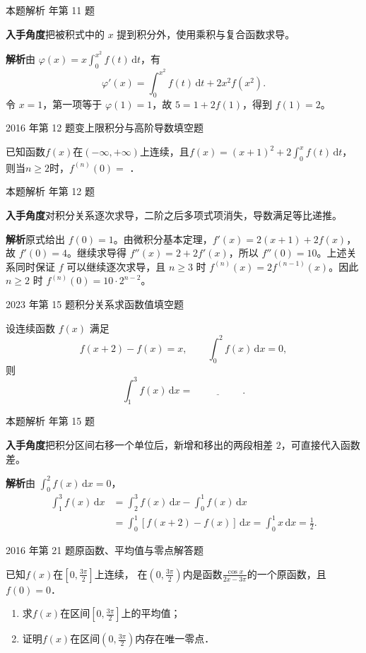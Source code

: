 \documentclass[UTF8,zihao=-4,fontset=fandol]{ctexart}
\newcommand{\blank}{\underline{\hspace{5em}}}
\newcommand{\QuestionPage}[6]{%
  \par\noindent\begin{minipage}{\linewidth}
  \raggedright
  {\small\textcolor{black!60}{#3\quad #5}\hfill\textcolor{accent}{#2}}\par\smallskip}
\newcommand{\QuestionEnd}{\end{minipage}\par\medskip}
\newcommand{\QuestionPage}[6]{%
  \clearpage
  {\small\textcolor{accent}{#1\hfill #2}}\par\medskip
  {\small\textcolor{black!60}{#3\quad #5\hfill #6}}\par\vspace{9bp}}
\newcommand{\QuestionEnd}{}
\newenvironment{QuestionSolution}[1]{%
  \clearpage
  {\small\textcolor{black!60}{本题解析\quad #1}}\par\medskip
}{\par\clearpage}
\begin{document}
\begin{QuestionSolution}{2015 年第 11 题}
\textbf{入手角度}\quad 把被积式中的 \(x\) 提到积分外，使用乘积与复合函数求导。

\textbf{解析}\quad 由 \(\varphi(x)=x\int_0^{x^2} f(t)\,\mathrm{d}t\)，有
\[
\varphi'(x)=\int_0^{x^2}f(t)\,\mathrm{d}t+2x^2 f(x^2).
\]
令 \(x=1\)，第一项等于 \(\varphi(1)=1\)，故 \(5=1+2f(1)\)，得到 \(f(1)=\boxed{2}\)。
\end{QuestionSolution}

\QuestionPage{3.2 微积分基本公式与基本定理}{填空题}{2016 年第 12 题}{2}{变上限积分与高阶导数}{146 / 234}
已知函数$f(x)$在$(-\infty,+\infty)$上连续，且$f(x) = (x + 1)^2 + 2\int_0^x f(t) \,\mathrm{d} t$，
则当$n \ge 2$时，$f^{(n)}(0) =$ \blank{}．
\QuestionEnd

\begin{QuestionSolution}{2016 年第 12 题}
\textbf{入手角度}\quad 对积分关系逐次求导，二阶之后多项式项消失，导数满足等比递推。

\textbf{解析}\quad 原式给出 \(f(0)=1\)。由微积分基本定理，\(f'(x)=2(x+1)+2f(x)\)，故 \(f'(0)=4\)。继续求导得 \(f''(x)=2+2f'(x)\)，所以 \(f''(0)=10\)。上述关系同时保证 \(f\) 可以继续逐次求导，且 \(n\ge3\) 时 \(f^{(n)}(x)=2f^{(n-1)}(x)\)。因此 \(n\ge2\) 时 \(f^{(n)}(0)=\boxed{10\cdot2^{n-2}}\)。
\end{QuestionSolution}

\QuestionPage{3.2 微积分基本公式与基本定理}{填空题}{2023 年第 15 题}{2}{积分关系求函数值}{147 / 234}
设连续函数 \(f(x)\) 满足
\[f(x+2)-f(x)=x,\qquad \int_0^2 f(x)\,\mathrm{d}x=0,
\]
则
\[\int_1^3 f(x)\,\mathrm{d}x=\blank{}.
\]
\QuestionEnd

\begin{QuestionSolution}{2023 年第 15 题}
\textbf{入手角度}\quad 把积分区间右移一个单位后，新增和移出的两段相差 \(2\)，可直接代入函数差。

\textbf{解析}\quad 由 \(\int_0^2 f(x)\,\mathrm{d}x=0\)，
\[
\begin{aligned}
\int_1^3f(x)\,\mathrm{d}x
&=\int_2^3f(x)\,\mathrm{d}x-\int_0^1f(x)\,\mathrm{d}x\\
&=\int_0^1[f(x+2)-f(x)]\,\mathrm{d}x
=\int_0^1 x\,\mathrm{d}x=\boxed{\frac12}.
\end{aligned}
\]
\end{QuestionSolution}

\QuestionPage{3.2 微积分基本公式与基本定理}{解答题}{2016 年第 21 题}{4}{原函数、平均值与零点}{148 / 234}
已知$f(x)$在$\left[0,\frac{3\pi}{2} \right]$上连续，
在$\left(0,\frac{3\pi}{2} \right)$内是函数$\frac{\cos x}{2x - 3\pi}$的一个原函数，且$f(0) = 0$．
\begin{enumerate}
\item 求$f(x)$在区间$\left[0,\frac{3\pi}{2} \right]$上的平均值；
\item 证明$f(x)$在区间$\left(0,\frac{3\pi}{2} \right)$内存在唯一零点．
\end{enumerate}
\QuestionEnd
\end{document}
